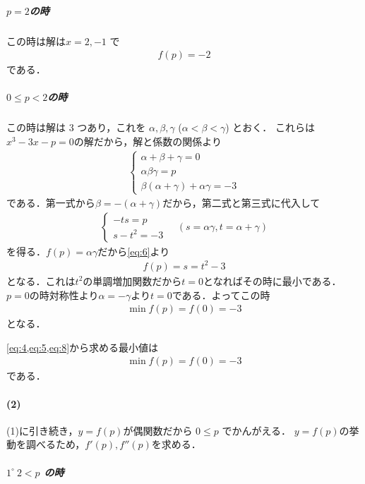 \documentclass[../../main.tex]{subfiles}
\begin{document}
\subparagraph{$p=2$の時}

この時は解は$x = 2, -1$ で
\begin{align}
  f(p) = -2 \label{eq:5}
\end{align}
である．

\subparagraph{$0\le p<2$の時}

この時は解は 3 つあり，これを $\alpha, \beta, \gamma$ ($\alpha < \beta < \gamma$) とおく．
これらは$x^3-3x-p=0$の解だから，解と係数の関係より
\begin{align}
  \begin{cases}
    \alpha + \beta + \gamma = 0 \\
    \alpha \beta \gamma = p \\
    \beta(\alpha + \gamma) + \alpha \gamma = -3
  \end{cases}
\end{align}
である．第一式から$\beta = -(\alpha+\gamma)$だから，第二式と第三式に代入して
\begin{align}
  \begin{cases}
    -t s = p \\
    s - t^2 = -3
  \end{cases}
  \quad (s = \alpha \gamma, t = \alpha + \gamma) \label{eq:6}
\end{align}
を得る．$f(p)=\alpha\gamma$だから\cref{eq:6}より
\begin{align}
  f(p) = s = t^2-3 \label{eq:7}
\end{align}
となる．これは$t^2$の単調増加関数だから$t=0$となればその時に最小である．
$p=0$の時対称性より$\alpha=-\gamma$より$t=0$である．よってこの時
\begin{align}
  \min f(p) = f(0) = -3 \label{eq:8}
\end{align}
となる．
\casesend

\cref{eq:4,eq:5,eq:8}から求める最小値は
\begin{align}
  \min f(p) = f(0) = -3
\end{align}
である．

\paragraph{(2)}

(1)に引き続き，$y=f(p)$が偶関数だから $0 \le p$ でかんがえる．
$y=f(p)$の挙動を調べるため，$f'(p), f''(p)$を求める．

\subparagraph{$1^\circ \ 2 < p$ の時}
\end{document}
